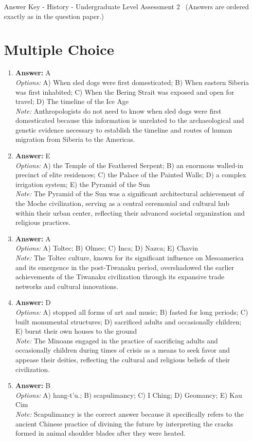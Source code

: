 \documentclass[12pt]{article}
\begin{document}
\begin{center}
Answer Key - History - Undergraduate Level Assessment 2 \
\small (Answers are ordered exactly as in the question paper.)
\end{center}

\section*{Multiple Choice}
\begin{enumerate}[label=\arabic*.]
\item \textbf{Answer:} A
\\ \textit{Options:} A) When sled dogs were first domesticated; B) When eastern Siberia was first inhabited; C) When the Bering Strait was exposed and open for travel; D) The timeline of the Ice Age
\\ \textit{Note:} Anthropologists do not need to know when sled dogs were first domesticated because this information is unrelated to the archaeological and genetic evidence necessary to establish the timeline and routes of human migration from Siberia to the Americas.
\item \textbf{Answer:} E
\\ \textit{Options:} A) the Temple of the Feathered Serpent; B) an enormous walled-in precinct of elite residences; C) the Palace of the Painted Walls; D) a complex irrigation system; E) the Pyramid of the Sun
\\ \textit{Note:} The Pyramid of the Sun was a significant architectural achievement of the Moche civilization, serving as a central ceremonial and cultural hub within their urban center, reflecting their advanced societal organization and religious practices.
\item \textbf{Answer:} A
\\ \textit{Options:} A) Toltec; B) Olmec; C) Inca; D) Nazca; E) Chavin
\\ \textit{Note:} The Toltec culture, known for its significant influence on Mesoamerica and its emergence in the post-Tiwanaku period, overshadowed the earlier achievements of the Tiwanaku civilization through its expansive trade networks and cultural innovations.
\item \textbf{Answer:} D
\\ \textit{Options:} A) stopped all forms of art and music; B) fasted for long periods; C) built monumental structures; D) sacrificed adults and occasionally children; E) burnt their own houses to the ground
\\ \textit{Note:} The Minoans engaged in the practice of sacrificing adults and occasionally children during times of crisis as a means to seek favor and appease their deities, reflecting the cultural and religious beliefs of their civilization.
\item \textbf{Answer:} B
\\ \textit{Options:} A) hang-t'u.; B) scapulimancy; C) I Ching; D) Geomancy; E) Kau Cim
\\ \textit{Note:} Scapulimancy is the correct answer because it specifically refers to the ancient Chinese practice of divining the future by interpreting the cracks formed in animal shoulder blades after they were heated.
\end{enumerate}
\end{document}
